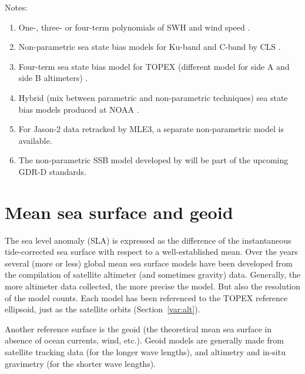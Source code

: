 \documentclass[a4paper,11pt,openany,natbib]{thesis}
\begin{document}
Notes:
\begin{enumerate}
\item One-, three- or four-term polynomials of SWH and wind speed \citep{gaspar1994a}.\label{item:ssb_bm3}
\item Non-parametric sea state bias models for Ku-band and C-band by CLS \citep{gaspar2002,labroue2004}.\label{item:ssb_cls}\label{item:ssb_cls_c}
\item Four-term sea state bias model for TOPEX (different model for side A and side B altimeters) \citep{chambers2003a}.\label{item:ssb_csr}
\item Hybrid (mix between parametric and non-parametric techniques) sea state bias models produced at NOAA \citep{scharroo2005e}.\label{item:ssb_hyb}
\item For Jason-2 data retracked by MLE3, a separate non-parametric model is available.\label{item:ssb_cls_mle3}
\item The non-parametric SSB model developed by \citet{tran2012} will be part of the upcoming GDR-D standards.\label{item:ssb_tran2012}
\end{enumerate}

\section{Mean sea surface and geoid}
\label{var:geoid}\label{var:mss}
The sea level anomaly (SLA) is expressed as the difference of the instantaneous tide-corrected sea surface with respect to a well-established mean. Over the years several (more or less) global mean sea surface models have been developed from the compilation of satellite altimeter (and sometimes gravity) data. Generally, the more altimeter data collected, the more precise the model. But also the resolution of the model counts. Each model has been referenced to the TOPEX reference ellipsoid, just as the satellite orbits (Section~\ref{var:alt}).

Another reference surface is the geoid (the theoretical mean sea surface in absence of ocean currents, wind, etc.). Geoid models are generally made from satellite tracking data (for the longer wave lengths), and altimetry and in-situ gravimetry (for the shorter wave lengths).
\end{document}
